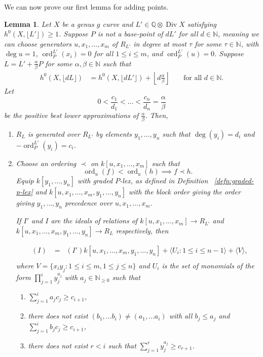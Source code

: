 \documentclass{amsart}
\theoremstyle{plain}
\newtheorem{lem}[thm]{Lemma}
\theoremstyle{definition}
\theoremstyle{remark}
\numberwithin{equation}{section}
\newcommand\BN{{\mathbb N}}
\newcommand\BQ{{\mathbb Q}}
\DeclareMathOperator{\ord}{ord}
\DeclareMathOperator\di{Div}
\newcommand{\halfcan}{L}
\DeclareMathOperator{\initial}{in_\prec}
\begin{document}
We can now prove our first lemma for adding points.

\begin{lem}
\label{lem:sat-1}
Let $X$ be a genus $g$ curve and $\halfcan' \in \BQ \otimes \di X$
satisfying $h^0(X, \lfloor{\halfcan'}\rfloor)\ge 1$. Suppose $P$ is not a base-point of $d\halfcan'$ for all $d \in \BN$, meaning we can choose generators $u, x_1, \ldots, x_m$ of $R_{\halfcan'}$ in degree at most $\tau$ for some $\tau\in \BN$, with $\deg u = 1$, $\ord_P^{\halfcan'}(x_i)=0$ for all $1 \leq i \leq m$, and $\ord_P^{\halfcan'}(u) = 0$.  Suppose $\halfcan = \halfcan' + \frac{\alpha}{\beta} P$
for some $\alpha,\beta \in \BN$ such that
\begin{align}
\label{eqn:deg1-sat-ind}
	h^0(X, \lfloor{d\halfcan}\rfloor) &= h^0(X,\lfloor d\halfcan'
	\rfloor) + \left\lfloor d\frac{\alpha} {\beta} \right \rfloor &&\text{ for all } d \in \mathbb{
	N}.
\end{align}
Let
\[
	0 < \frac{c_1}{d_1} < \ldots < \frac{c_n}{d_n} = \frac{\alpha}{\beta}
\]
be the positive best lower approximations of $\frac{\alpha}{\beta}$.
Then,

\begin{enumerate}
\item[(a)] $R_{\halfcan}$ is generated over $R_{\halfcan'}$ by 
	elements $y_1, \ldots, y_n$ such that $\deg(y_i) = d_i$ and $-\ord_P
	^{L'}(y_i) = c_i$.

\item[(b)] Choose an ordering $\prec$ on $k[u, x_1, \ldots, x_m]$ such that
	\[
		\ord_u(f) < \ord_u(h) \implies f\prec h.
	\]
	Equip $k[y_1, \ldots, y_n]$ with graded $P$-lex, as defined in
	Definition ~\ref{defn:graded-p-lex} and $k[u, x_1, \ldots, x_m, y_1,
	\ldots, y_n]$ with the block order giving the order giving $y_1, 
	\ldots, y_n$ precedence over $u, x_1, \ldots, x_m$.

	If $I'$ and $I$ are the ideals of relations of $k[u, x_1, \ldots, x_m]
	\to R_{\halfcan'}$ and $k[u, x_1, \ldots, x_m, y_1, \ldots, y_n]
	\to R_{\halfcan}$ respectively, then

	\begin{align*}
		\initial(I) &= \initial(I') k[u, x_1, \ldots, x_m, y_1, \ldots, y_n] 
											 + \langle U_i: 1 \le i \le n-1 \rangle
											 + \langle V \rangle,\\
	\end{align*}
	where $V = \{x_i y_j: 1 \le i \le m, 1 \le j \le n\}$ and $U_i$ is
	the set of monomials of the form $\prod_{j = 1}^{i} y_j^{a_j}$ with
	$a_j \in \BN_{\ge 0}$ such that
	\begin{enumerate}
		\item[(*)] $\sum_{j=1}^i a_j c_j \ge c_{i+1}$, \\
		\item[(**)] there does not exist $(b_1, \ldots b_i) \ne (a_1,
			\ldots a_i)$ with all $b_j \le a_j$ and $\sum_{j = 1}^i b_j
			c_j \ge	c_{i + 1}$, \\
		\item[(***)] there does not exist $r<i$ such that $\sum_{j=1}^r y_j^{a_j}\ge c_{r + 1}$.
	\end{enumerate}


\end{enumerate}
\end{lem}
\end{document}
